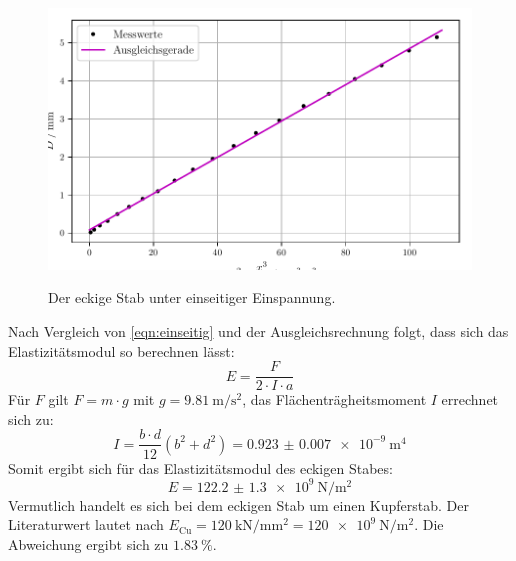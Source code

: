 \begin{figure}
  \centering
  \caption{Der eckige Stab unter einseitiger Einspannung.}
  \includegraphics{build/plotk.pdf}
  \label{fig:eckig}
\end{figure}
Nach Vergleich von \eqref{eqn:einseitig}
und der Ausgleichsrechnung folgt, dass sich das Elastizitätsmodul so berechnen lässt:
\begin{equation*}
  E = \frac{F}{2 \cdot I \cdot a} 
\end{equation*}
Für $F$ gilt $F = m \cdot g$ mit $g=\SI{9.81}{\metre\per\second\squared}$, das Flächenträgheitsmoment $I$ errechnet sich zu:
\begin{equation*}
  I = \frac{b\cdot d}{12} (b^2 + d^2) = \SI{0.923(7)e-9}{\metre\tothe{4}}
\end{equation*}
Somit ergibt sich für das Elastizitätsmodul des eckigen Stabes:
\begin{equation*}
  E = \SI{122.2(13)e9}{\newton\per\metre\squared}
\end{equation*}
Vermutlich handelt es sich bei dem eckigen Stab um einen Kupferstab. Der Literaturwert lautet nach %
$E_{\text{Cu}} = \SI{120}{\kilo\newton\per\milli\metre\squared} = \SI{120e9}{\newton\per\metre\squared}$. 
Die Abweichung ergibt sich zu $\SI{1.83}{\percent}$.  


